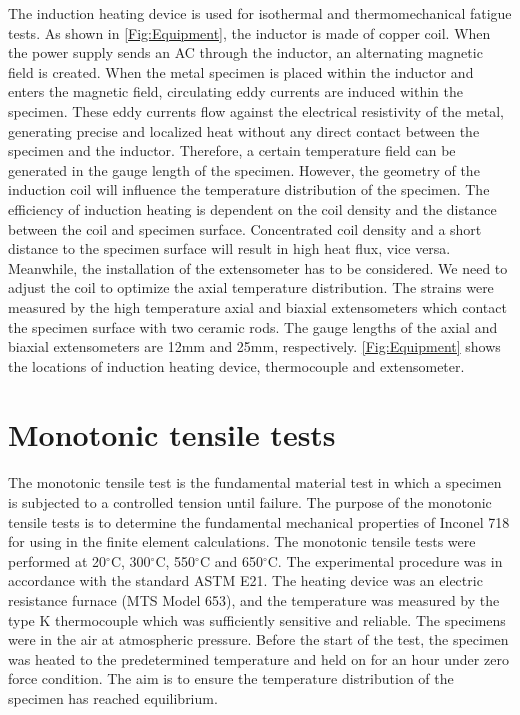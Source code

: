 The induction heating device is used for isothermal and thermomechanical fatigue tests.
As shown in \ref{Fig:Equipment}, the inductor is made of copper coil.
When the power supply sends an AC through the inductor, an alternating magnetic field is created.
When the metal specimen is placed within the inductor and enters the magnetic field, circulating eddy currents are induced within the specimen.
These eddy currents flow against the electrical resistivity of the metal, generating precise and localized heat without any direct contact between the specimen and the inductor.
Therefore, a certain temperature field can be generated in the gauge length of the specimen.
However, the geometry of the induction coil will influence the temperature distribution of the specimen.
The efficiency of induction heating is dependent on the coil density and the distance between the coil and specimen surface.
Concentrated coil density and a short distance to the specimen surface will result in high heat flux, vice versa.
Meanwhile, the installation of the extensometer has to be considered.
We need to adjust the coil to optimize the axial temperature distribution.
The strains were measured by the high temperature axial and biaxial extensometers which contact the specimen surface with two ceramic rods.
The gauge lengths of the axial and biaxial extensometers are 12mm and 25mm, respectively.
\ref{Fig:Equipment} shows the locations of induction heating device, thermocouple and extensometer.


\section{Monotonic tensile tests}
\noindent 
The monotonic tensile test is the fundamental material test in which a specimen is subjected to a controlled tension until failure.
The purpose of the monotonic tensile tests is to determine the fundamental mechanical properties of Inconel 718 for using in the finite element calculations.
The monotonic tensile tests were performed at 20$^{\circ}$C, 300$^{\circ}$C, 550$^{\circ}$C and 650$^{\circ}$C.
The experimental procedure was in accordance with the standard ASTM E21.
The heating device was an electric resistance furnace (MTS Model 653), and the temperature was measured by the type K thermocouple which was sufficiently sensitive and reliable.
The specimens were in the air at atmospheric pressure.
Before the start of the test, the specimen was heated to the predetermined temperature and held on for an hour under zero force condition.
The aim is to ensure the temperature distribution of the specimen has reached equilibrium.

